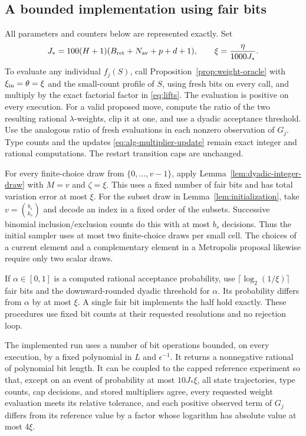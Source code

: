 \subsection{A bounded implementation using fair bits}

All parameters and counters below are represented exactly.  Set
\begin{equation}
 J_*=100(H+1)(B_{\rm ret}+N_{\rm av}+p+d+1),
 \qquad
 \xi=\frac{\eta}{1000J_*}.
 \label{eq:alg-bit-parameters}
\end{equation}
To evaluate any individual \(f_j(S)\), call
Proposition~\ref{prop:weight-oracle} with
\(\xi_{\rm in}=\theta=\xi\) and the small-count profile of \(S\),
using fresh bits on every call, and multiply by the exact factorial
factor in \eqref{eq:lifts}.  The evaluation is positive on every
execution.  For a valid proposed move, compute the ratio of the two
resulting rational \(\lambda\)-weights, clip it at one, and use a
dyadic acceptance threshold.  Use the analogous ratio of fresh
evaluations in each nonzero observation of \(G_j\).  Type counts and
the updates \eqref{eq:alg-multiplier-update} remain exact integer
and rational computations.  The restart transition caps are
unchanged.

For every finite-choice draw from \(\{0,\ldots,v-1\}\), apply
Lemma~\ref{lem:dyadic-integer-draw} with \(M=v\) and \(\zeta=\xi\).
This uses a fixed number of fair bits and has total variation error
at most \(\xi\).
For the subset draw in Lemma~\ref{lem:initialization}, take
\(v=\binom{b_s}{k_s}\) and decode an index in a fixed order of
the subsets.  Successive binomial inclusion/exclusion counts do
this with at most \(b_s\) decisions.  Thus the initial sampler uses
at most two finite-choice draws per small cell.  The choices of a
current element and a complementary element in a Metropolis proposal
likewise require only two scalar draws.

If \(\alpha\in[0,1]\) is a computed rational acceptance
probability, use
\(\lceil\log_2(1/\xi)\rceil\) fair bits and the downward-rounded
dyadic threshold for \(\alpha\).  Its probability differs from
\(\alpha\) by at most \(\xi\).  A single fair bit implements the
half hold exactly.  These procedures use fixed bit counts at their
requested resolutions and no rejection loop.

\begin{samepage}
\begin{lemma}
\label{lem:bounded-implementation}
The implemented run uses a number of bit operations bounded, on
every execution, by a fixed polynomial in \(L\) and
\(\epsilon^{-1}\).  It returns a nonnegative rational of polynomial
bit length.  It can be coupled to the capped reference experiment
so that, except on an event of probability at most \(10J_*\xi\),
all state trajectories, type counts, cap decisions, and stored
multipliers agree, every requested weight evaluation meets its
relative tolerance, and each positive observed term of \(G_j\)
differs from its reference value by a factor whose logarithm has
absolute value at most \(4\xi\).
\end{lemma}
\end{samepage}

